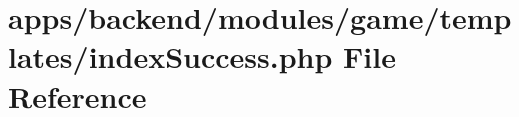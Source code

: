 \hypertarget{backend_2modules_2game_2templates_2index_success_8php}{\section{apps/backend/modules/game/templates/index\-Success.php File Reference}
\label{backend_2modules_2game_2templates_2index_success_8php}
}
